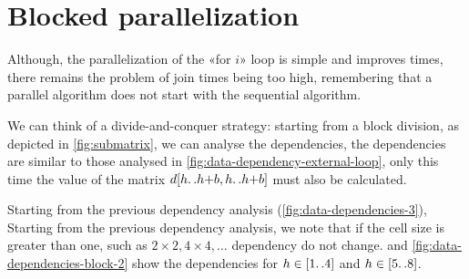 \section{Blocked parallelization}\label{blocked_parallelization}

Although, the parallelization of the «for \(i\)» loop is simple and improves times, there remains the problem of join times being too high, remembering that a parallel algorithm does not start with the sequential algorithm.

We can think of a divide-and-conquer strategy: starting from a block division, as depicted in \cref{fig:submatrix}, we can analyse the dependencies, the dependencies are similar to those analysed in \cref{fig:data-dependency-external-loop}, only this time the value of the matrix \(d[h{\mathinner {\ldotp \ldotp}}h{+}b,h{\mathinner {\ldotp \ldotp}}h{+}b]\) must also be calculated.

Starting from the previous dependency analysis (\cref{fig:data-dependencies-3}), Starting from the previous dependency analysis, we note that if the cell size is greater than one, such as  \(  2 \times 2,  4 \times 4, \dots\) dependency do not change.
 and \ref{fig:data-dependencies-block-2} show the dependencies for \(h \in [1{\mathinner {\ldotp \ldotp}}4]\) and \(h \in [5{\mathinner {\ldotp \ldotp}}8]\).

